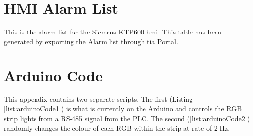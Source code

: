 \chapter{HMI Alarm List} \label{app:alarmList}
    This is the alarm list for the Siemens KTP600 \acrshort{hmi}. This table has been generated by exporting the Alarm list through \acrshort{tia} Portal. 
    

\chapter{Arduino Code} \label{app:arduino}
    This appendix contains two separate scripts. The first (Listing \ref{list:arduinoCode1}) is what is currently on the Arduino and controls the RGB strip lights from a RS-485 signal from the PLC. The second (\ref{list:arduinoCode2}) randomly changes the colour of each RGB within the strip at rate of 2 Hz. 
    

    


